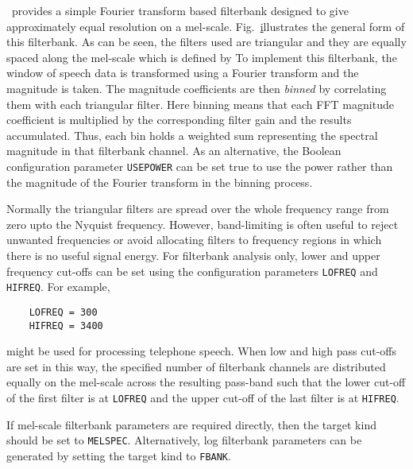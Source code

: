 \HTK\ provides a simple Fourier transform based filterbank designed to
give approximately equal resolution on a mel-scale.  Fig.~\href{f:melfbank}
illustrates the general form of this filterbank.    As can be seen,
the filters used are triangular and they are equally spaced along the mel-scale
which is defined by
To implement this filterbank, the window of speech data is
transformed using a Fourier transform and the magnitude is
taken.  The magnitude coefficients are then \textit{binned} by correlating them
with each triangular filter.  Here binning means that each FFT magnitude
coefficient is multiplied by the corresponding filter gain and the results
accumulated.  Thus, each bin holds a weighted sum representing the spectral
magnitude in that filterbank channel. As an alternative, the
Boolean configuration parameter
\texttt{USEPOWER} can be set true to use the
power rather than the magnitude of the Fourier transform in the binning
process.  


Normally the triangular filters are spread over the whole frequency range from
zero upto the Nyquist frequency.  However, band-limiting is often useful to
reject unwanted frequencies or avoid allocating filters to frequency regions in
which there is no useful signal energy.  For filterbank analysis only, lower
and upper frequency cut-offs can be set using the configuration parameters
\texttt{LOFREQ} and
\texttt{HIFREQ}. For example,
\begin{verbatim}
    LOFREQ = 300
    HIFREQ = 3400
\end{verbatim}
might be used for processing telephone speech.  When low and high pass cut-offs
are set in this way, the specified number of filterbank channels are distributed
equally on the mel-scale across the resulting pass-band such that the lower cut-off
of the first filter is at \texttt{LOFREQ} and the upper cut-off of the last
filter is at \texttt{HIFREQ}.

If mel-scale filterbank parameters are required directly, then the target kind
should be set to \texttt{MELSPEC}.
Alternatively, log filterbank parameters can be generated by setting the target
kind to \texttt{FBANK}.  


